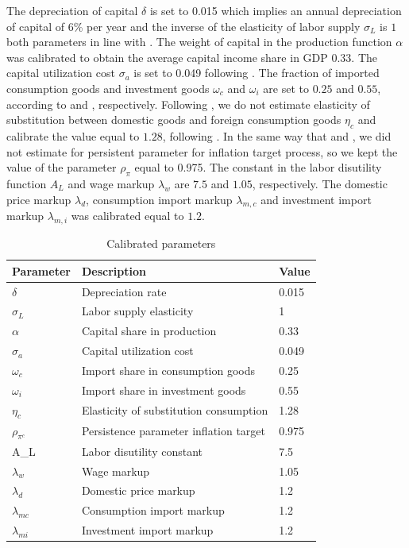 \documentclass[12pt,oneside,a4paper]{article}
\begin{document}
The depreciation of capital $\delta$ is set to 0.015 which implies an annual depreciation of capital of 6\% per year and the inverse of the elasticity of labor supply $\sigma_{L}$ is $1$ both parameters in line with \citet{Castro:2015}. The weight of capital in the production function $\alpha$ was calibrated to obtain the average capital income share in GDP 0.33. The capital utilization cost $\sigma_{a}$ is set to 0.049 following \citet{Altig:2011}. The fraction of imported consumption goods and investment goods $\omega_{c}$ and $\omega_{i}$ are set to $0.25$ and $0.55$, according to \citet{Carvalho:2015} and \citet{Adolfson:2007}, respectively. Following \citet{Adolfson:2007}, we do not estimate elasticity of substitution between domestic goods and foreign consumption goods $\eta_{c}$ and calibrate the value equal to $1.28$, following \citet{Palma:2014}. In the same way that \citet{Adolfson:2007} and \citet{Smets:2003}, we did not estimate for persistent parameter for inflation target process, so we kept the value of the parameter $\rho_{\pi}$ equal to 0.975. The constant in the labor disutility function $A_{L}$ and wage markup $\lambda_{w}$ are $7.5$ and $1.05$, respectively. The domestic price markup $\lambda_{d}$, consumption import markup $\lambda_{m,c}$ and investment import markup $\lambda_{m,i}$ was calibrated equal to $1.2$.


\begin{table}[H]
\centering
\caption{Calibrated parameters}
\label{table:calibracao}
\begin{tabular}{lll}
\hline
Parameter & Description                            & Value \\
\hline
$\delta$     & Depreciation rate                      & 0.015 \\
$\sigma_{L}$   & Labor supply elasticity                & 1     \\
$\alpha$     & Capital share in production            & 0.33  \\
$\sigma_{a}$   & Capital utilization cost                & 0.049 \\
$\omega_{c}$   & Import share in consumption goods      & 0.25  \\
$\omega_{i}$   & Import share in investment goods       & 0.55  \\
$\eta_{c}$     & Elasticity of substitution consumption & 1.28  \\
$\rho_{\pi^{c}}$    & Persistence parameter inflation target & 0.975 \\
A_L       & Labor disutility constant              & 7.5   \\
$\lambda_{w}$  & Wage markup                           & 1.05 \\
$\lambda_{d}$ & Domestic price markup                  & 1.2 \\
$\lambda_{mc}$ & Consumption import markup             & 1.2 \\
$\lambda_{mi}$ & Investment import markup              & 1.2 \\
\hline
\end{tabular}
\end{table}
\end{document}
